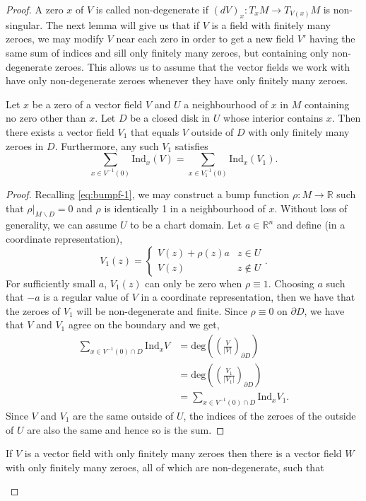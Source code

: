 \begin{proof}
A zero $x$ of $V$ is called non-degenerate if $(dV)_x:T_xM\to T_{V(x)}M$ is non-singular. The next lemma will give us that if $V$ is a field with finitely many zeroes, we may modify $V$ near each zero in order to get a new field $V'$ having the same sum of indices and sill only finitely many zeroes, but containing only non-degenerate zeroes. This allows us to assume that the vector fields we work with have only non-degenerate zeroes whenever they have only finitely many zeroes.  
\begin{lemma}
Let $x$ be a zero of a vector field $V$ and $U$ a neighbourhood of $x$ in $M$ containing no zero other than $x$. Let $D$ be a closed disk in $U$ whose interior contains $x$. Then there exists a vector field $V_1$ that equals $V$ outside of $D$ with only finitely many zeroes in $D$. Furthermore, any such $V_1$ satisfies
\[
\sum_{x\in V^{-1}(0)}\mathrm{Ind}_x(V)=\sum_{x\in V_1^{-1}(0)}\mathrm{Ind}_x(V_1).
\] 
\end{lemma}
\begin{proof}
Recalling \eqref{eq:bumpf-1}, we may construct a bump function $\rho:M\to\mathbb{R}$ such that $\rho\rvert_{M\backslash D}=0$ and $\rho$ is identically 1 in a neighbourhood of $x$. Without loss of generality, we can assume $U$ to be a chart domain. Let $a\in\mathbb{R}^n$ and define (in a coordinate representation),
\[
V_1(z)=\begin{cases}
V(z)+\rho(z)a & z\in U\\
V(z) & z\notin U
\end{cases}.
\] 
For sufficiently small $a$, $V_1(z)$ can only be zero when $\rho\equiv 1$. Choosing $a$ such that $-a$ is a regular value of $V$ in a coordinate representation, then we have that the zeroes of $V_1$ will be non-degenerate and finite. Since $\rho\equiv 0$ on $\partial D$, we have that $V$ and $V_1$ agree on the boundary and we get,
\begin{align*}
\sum_{x\in V^{-1}(0)\cap D}\mathrm{Ind}_xV&=\mathrm{deg}\left(\left(\frac{V}{|V|}\right)_{\partial D} \right)\\
&=\mathrm{deg}\left(\left(\frac{V_1}{|V_1|}\right)_{\partial D}\right)\\
&=\sum_{x\in V^{-1}(0)\cap D}\mathrm{Ind}_xV_1.
\end{align*}
Since $V$ and $V_1$ are the same outside of $U$, the indices of the zeroes of the outside of $U$ are also the same and hence so is the sum.
\end{proof}
\begin{corollary}
If $V$ is a vector field with only finitely many zeroes then there is a vector field $W$ with only finitely many zeroes, all of which are non-degenerate, such that

\end{corollary}
\end{proof}

